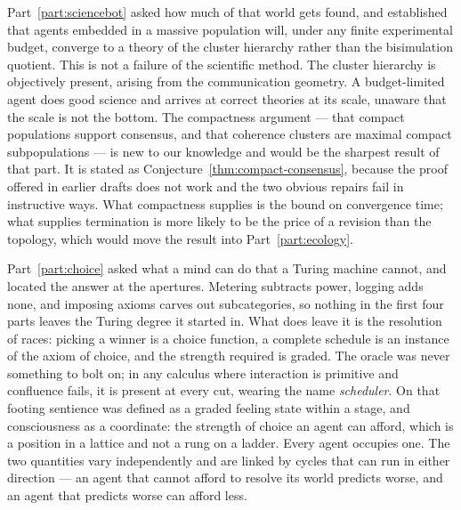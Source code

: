 Part~\ref{part:sciencebot} asked how much of that world gets found, and
established that agents embedded in a massive population will, under any
finite experimental budget, converge to a theory of the cluster hierarchy
rather than the bisimulation quotient.
This is not a failure of the scientific method.
The cluster hierarchy is objectively present, arising from the
communication geometry.
A budget-limited agent does good science and arrives at correct theories
at its scale, unaware that the scale is not the bottom.
The compactness argument --- that compact populations support consensus,
and that coherence clusters are maximal compact subpopulations --- is new
to our knowledge and would be the sharpest result of that part.
It is stated as Conjecture~\ref{thm:compact-consensus}, because the
proof offered in earlier drafts does not work and the two obvious
repairs fail in instructive ways.
What compactness supplies is the bound on convergence time; what
supplies termination is more likely to be the price of a revision than
the topology, which would move the result into
Part~\ref{part:ecology}.

Part~\ref{part:choice} asked what a mind can do that a Turing machine
cannot, and located the answer at the apertures.
Metering subtracts power, logging adds none, and imposing axioms carves
out subcategories, so nothing in the first four parts leaves the Turing
degree it started in.
What does leave it is the resolution of races: picking a winner is a
choice function, a complete schedule is an instance of the axiom of
choice, and the strength required is graded.
The oracle was never something to bolt on; in any calculus where
interaction is primitive and confluence fails, it is present at every
cut, wearing the name \emph{scheduler}.
On that footing sentience was defined as a graded feeling state within a
stage, and consciousness as a coordinate: the strength of choice an
agent can afford, which is a position in a lattice and not a rung on a
ladder.
Every agent occupies one.
The two quantities vary independently and are linked by cycles that can
run in either direction --- an agent that cannot afford to resolve its
world predicts worse, and an agent that predicts worse can afford
less.

